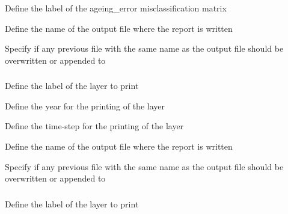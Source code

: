  {Define the label of the ageing\_error misclassification matrix}

 {Define the name of the output file where the report is written}

 {Specify if any previous file with the same name as the output file should be overwritten or appended to}

\subsubsection[Print a layer]{}

 {Define the label of the layer to print}

 {Define the year for the printing of the layer}

 {Define the time-step for the printing of the layer}

 {Define the name of the output file where the report is written}

 {Specify if any previous file with the same name as the output file should be overwritten or appended to}

\subsubsection[Print a derived view via a categorical layer]{}

 {Define the label of the layer to print}

